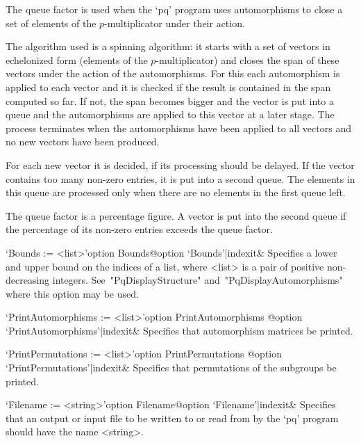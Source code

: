 The queue factor is used when the `pq' program uses automorphisms to close
a set of elements of the $p$-multiplicator under their action.

The algorithm used is a spinning algorithm:  it  starts  with  a  set  of
vectors in echelonized  form  (elements  of  the  $p$-multiplicator)  and
closes the span of these vectors under the action of  the  automorphisms.
For this each automorphism is applied to each vector and it is checked if
the result is contained in the span computed so far.  If  not,  the  span
becomes bigger and the vector is put into a queue and  the  automorphisms
are applied to this vector at a later stage. The process terminates  when
the automorphisms have been applied to all vectors  and  no  new  vectors
have been produced.

For each new vector it is decided, if its processing should  be  delayed.
If the vector contains too many non-zero entries, it is put into a second
queue. The elements in this queue are processed only when  there  are  no
elements in the first queue left.

The queue factor is a percentage figure. A vector is put into the  second
queue if the percentage of its non-zero entries exceeds the queue factor.

\>`Bounds := <list>'{option Bounds}@{option `Bounds'|indexit}&
Specifies a lower and upper bound on the indices of a list, where  <list>
is a pair of positive non-decreasing  integers.  See~"PqDisplayStructure"
and~"PqDisplayAutomorphisms" where this option may be used.

\>`PrintAutomorphisms := <list>'{option PrintAutomorphisms}%
@{option `PrintAutomorphisms'|indexit}&
Specifies that automorphism matrices be printed.

\>`PrintPermutations := <list>'{option PrintPermutations}%
@{option `PrintPermutations'|indexit}&
Specifies that permutations of the subgroups be printed.

\>`Filename := <string>'{option Filename}@{option `Filename'|indexit}&
Specifies that an output or input file to be written to or read  from  by
the `pq' program should have the name <string>.

\enditems

